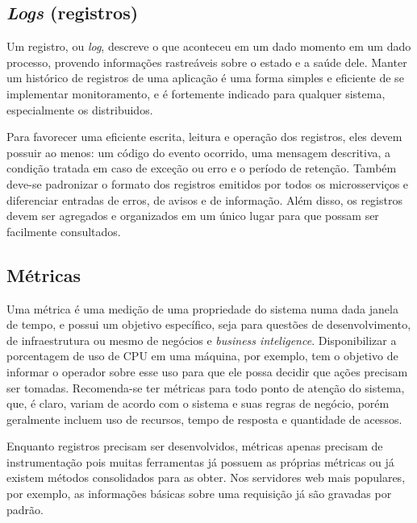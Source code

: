 \subsection{\emph{Logs} (registros)}\label{subsecao-registros}

Um registro, ou \emph{log}, descreve o que aconteceu em um dado momento em um dado processo, provendo informações rastreáveis sobre o estado e a saúde dele. Manter um histórico de registros de uma aplicação é uma forma simples e eficiente de se implementar monitoramento, e é fortemente indicado para qualquer sistema, especialmente os distribuidos. 

Para favorecer uma eficiente escrita, leitura e operação dos registros, eles devem possuir ao menos: um código do evento ocorrido, uma mensagem descritiva, a condição tratada em caso de exceção ou erro e o período de retenção. Também deve-se padronizar o formato dos registros emitidos por todos os microsserviços e diferenciar entradas de erros, de avisos e de informação. Além disso, os registros devem ser agregados e organizados em um único lugar para que possam ser facilmente consultados. \cite{livro-sre-google-workbook}



\subsection{Métricas}
Uma métrica é uma medição de uma propriedade do sistema numa dada janela de tempo, e possui um objetivo específico, seja para questões de desenvolvimento, de infraestrutura ou mesmo de negócios e \emph{business inteligence}. Disponibilizar a porcentagem de uso de CPU em uma máquina, por exemplo, tem o objetivo de informar o operador sobre esse uso para que ele possa decidir que ações precisam ser tomadas. Recomenda-se ter métricas para todo ponto de atenção do sistema, que, é claro, variam de acordo com o sistema e suas regras de negócio, porém geralmente incluem uso de recursos, tempo de resposta e quantidade de acessos.

Enquanto registros precisam ser desenvolvidos, métricas apenas precisam de instrumentação pois muitas ferramentas já possuem as próprias métricas ou já existem métodos consolidados para as obter. Nos servidores web mais populares, por exemplo, as informações básicas sobre uma requisição já são gravadas por padrão.

